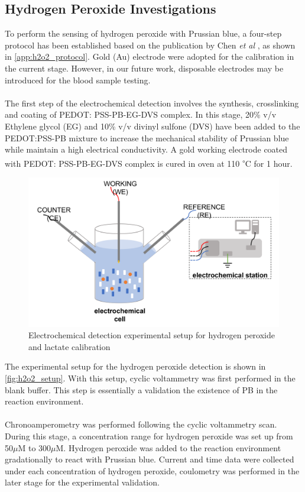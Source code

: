 \subsection{Hydrogen Peroxide Investigations}
To perform the sensing of hydrogen peroxide with Prussian blue, a four-step protocol has been established based on the publication by Chen \textit{et al} \cite{C9AN02438G}, as shown in \autoref{app:h2o2_protocol}. Gold (Au) electrode were adopted for the calibration in the current stage. However, in our future work, disposable electrodes may be introduced for the blood sample testing. \\\\
The first step of the electrochemical detection involves the synthesis, crosslinking and coating of PEDOT: PSS-PB-EG-DVS complex. In this stage, 20\% v/v Ethylene glycol (EG) and 10\% v/v divinyl sulfone (DVS) have been added to the PEDOT:PSS-PB mixture to increase the mechanical stability of Prussian blue while maintain a high electrical conductivity. A gold working electrode coated with PEDOT: PSS-PB-EG-DVS complex is cured in oven at 110 \textsuperscript{$\circ$}C for 1 hour.
\begin{figure}[H]
    \centering
    \includegraphics[width=.5\textwidth]{img/h2o2_setup.png}
    \caption{Electrochemical detection experimental setup for hydrogen peroxide and lactate calibration}
    \label{fig:h2o2_setup}
\end{figure}
\noindent The experimental setup for the hydrogen peroxide detection is shown in \autoref{fig:h2o2_setup}. With this setup, cyclic voltammetry was first performed in the blank buffer. This step is essentially a validation the existence of PB in the reaction environment. \\\\
\noindent Chronoamperometry was performed following the cyclic voltammetry scan. During this stage, a concentration range for hydrogen peroxide was set up from 50$\mu$M to 300$\mu$M. Hydrogen peroxide was added to the reaction environment gradationally to react with Prussian blue. Current and time data were collected under each concentration of hydrogen peroxide, coulometry was performed in the later stage for the experimental validation.

